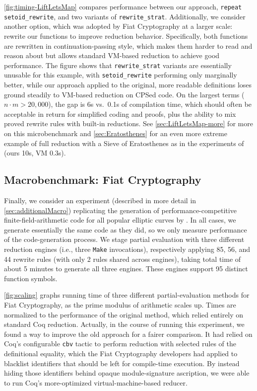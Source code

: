 \documentclass[sigplan,10pt,review,anonymous]{acmart}\settopmatter{printfolios=true,printccs=false,printacmref=false}
\begin{document}
\autoref{fig:timing-LiftLetsMap} compares performance between our approach, \texttt{repeat setoid\_rewrite}, and two variants of \texttt{rewrite\_strat}.
Additionally, we consider another option, which was adopted by Fiat Cryptography at a larger scale: rewrite our functions to improve reduction behavior.
Specifically, both functions are rewritten in continuation-passing style, which makes them harder to read and reason about but allows standard VM-based reduction to achieve good performance.
The figure shows that \texttt{rewrite\_strat} variants are essentially unusable for this example, with \texttt{setoid\_rewrite} performing only marginally better, while our approach applied to the original, more readable definitions loses ground steadily to VM-based reduction on CPSed code.
On the largest terms ($n \cdot m > 20,000$), the gap is 6s vs.\ 0.1s of compilation time, which should often be acceptable in return for simplified coding and proofs, plus the ability to mix proved rewrite rules with built-in reductions.
See \autoref{sec:LiftLetsMap-more} for more on this microbenchmark and \autoref{sec:Eratosthenes} for an even more extreme example of full reduction with a Sieve of Eratosthenes as in the experiments of \citet{Aehlig} (ours 10s, VM 0.3s).

\subsection{Macrobenchmark: Fiat Cryptography} \label{sec:macro}

Finally, we consider an experiment (described in more detail in \autoref{sec:additionalMacro}) replicating the generation of performance-competitive finite-field-arithmetic code for all popular elliptic curves by \citet{FiatCryptoSP19}.
In all cases, we generate essentially the same code as they did, so we only measure performance of the code-generation process.
We stage partial evaluation with three different reduction engines (i.e., three \texttt{Make} invocations), respectively applying 85, 56, and 44 rewrite rules (with only 2 rules shared across engines), taking total time of about 5 minutes to generate all three engines.
These engines support 95 distinct function symbols.

\autoref{fig:scaling} graphs running time of three different partial-evaluation methods for Fiat Cryptography, as the prime modulus of arithmetic scales up.
Times are normalized to the performance of the original method, which relied entirely on standard Coq reduction.
Actually, in the course of running this experiment, we found a way to improve the old approach for a fairer comparison.
It had relied on Coq's configurable \texttt{cbv} tactic to perform reduction with selected rules of the definitional equality, which the Fiat Cryptography developers had applied to blacklist identifiers that should be left for compile-time execution.
By instead hiding those identifiers behind opaque module-signature ascription, we were able to run Coq's more-optimized virtual-machine-based reducer.
\end{document}
